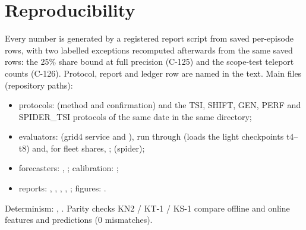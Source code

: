 \documentclass[11pt]{article}
\begin{document}
\section{Reproducibility}
Every number is generated by a registered report script from saved per-episode rows, with two labelled exceptions recomputed
afterwards from the same saved rows: the 25\% share bound at full precision (C-125) and the scope-test teleport counts (C-126).
Protocol, report and ledger row are named in the text. Main files (repository paths):
\begin{itemize}\setlength\itemsep{0pt}
\item protocols:  (method and confirmation) and the TSI, SHIFT, GEN, PERF and
SPIDER\_TSI protocols of the same date in the same directory;
\item evaluators:  (grid4 service and ), run through
 (loads the light checkpoints t4--t8) and, for fleet shares, ;  (spider);
\item forecasters: , ; calibration: ;
\item reports: , , , ,
; figures: .
\end{itemize}
Determinism: , . Parity checks KN2 / KT-1 / KS-1 compare offline and online features and
predictions (0 mismatches).
\end{document}
